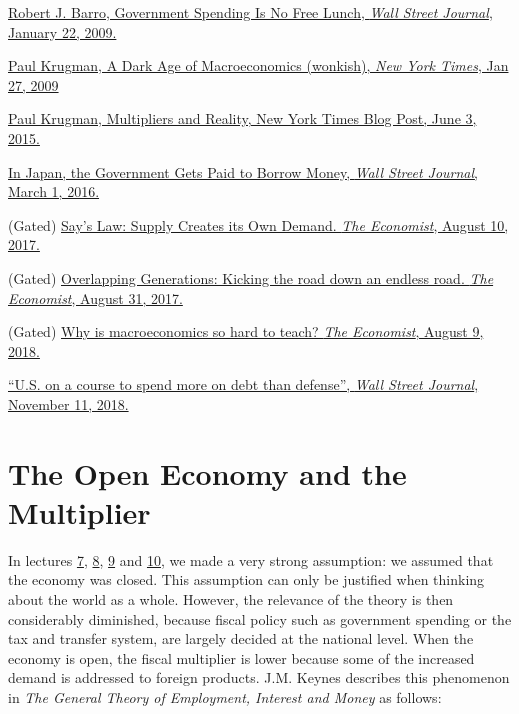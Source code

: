 \documentclass[]{book}
\theoremstyle{definition}
\theoremstyle{definition}
\theoremstyle{definition}
\theoremstyle{remark}
\begin{document}
\href{https://search.proquest.com/docview/399114897/CBD1D9A468D04A85PQ/2?accountid=14512}{Robert
J. Barro, Government Spending Is No Free Lunch, \emph{Wall Street
Journal}, January 22, 2009.}

\href{https://search.proquest.com/docview/1930920374/1A771BC8177A4FB7PQ/1?accountid=14512}{Paul
Krugman, A Dark Age of Macroeconomics (wonkish), \emph{New York Times},
Jan 27, 2009}

\href{https://krugman.blogs.nytimes.com/2015/06/03/multipliers-and-reality/}{Paul
Krugman, Multipliers and Reality, New York Times Blog Post, June 3,
2015.}

\href{https://search.proquest.com/docview/1768757479/E1052F8FA6974859PQ/1?accountid=14512}{In
Japan, the Government Gets Paid to Borrow Money, \emph{Wall Street
Journal}, March 1, 2016.}

(Gated)
\href{https://www.economist.com/economics-brief/2017/08/10/says-law-supply-creates-its-own-demand}{Say's
Law: Supply Creates its Own Demand. \emph{The Economist}, August 10,
2017.}

(Gated)
\href{https://www.economist.com/economics-brief/2017/08/31/kicking-the-can-down-an-endless-road}{Overlapping
Generations: Kicking the road down an endless road. \emph{The
Economist}, August 31, 2017.}

(Gated)
\href{https://www.economist.com/finance-and-economics/2018/08/09/why-is-macroeconomics-so-hard-to-teach}{Why
is macroeconomics so hard to teach? \emph{The Economist}, August 9,
2018.}

\href{https://search.proquest.com/docview/2131663609/B6DB7A44958C4606PQ/1?accountid=14512}{``U.S.
on a course to spend more on debt than defense'', \emph{Wall Street
Journal}, November 11, 2018.}

\hypertarget{open}{\chapter{The Open Economy and the
Multiplier}\label{open}}

In lectures \protect\hyperlink{cons-function}{7},
\protect\hyperlink{paradox-thrift}{8},
\protect\hyperlink{redistributive}{9} and
\protect\hyperlink{public-debt}{10}, we made a very strong assumption:
we assumed that the economy was closed. This assumption can only be
justified when thinking about the world as a whole. However, the
relevance of the theory is then considerably diminished, because fiscal
policy such as government spending or the tax and transfer system, are
largely decided at the national level. When the economy is open, the
fiscal multiplier is lower because some of the increased demand is
addressed to foreign products. J.M. Keynes describes this phenomenon in
\emph{The General Theory of Employment, Interest and Money} as follows:
\end{document}
